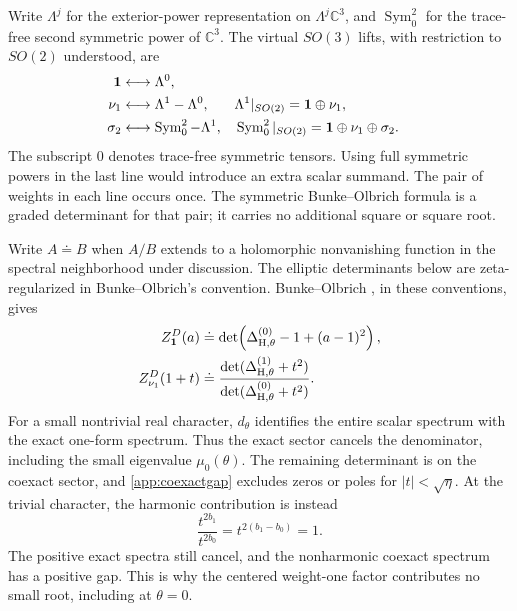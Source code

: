 \documentclass[11pt,letterpaper,reqno]{amsart}
\theoremstyle{remark}
\begin{document}
Write $\Lambda^j$ for the exterior-power representation on
$\Lambda^j\mathbb C^3$, and $\operatorname{Sym}^2_0$ for the trace-free
second symmetric power of $\mathbb C^3$. The virtual $SO(3)$ lifts,
with restriction to $SO(2)$ understood, are
\begin{align}\label{app:virtuallifts}
 \mathbf1&\longleftrightarrow\Lambda^0,\notag\\
 \nu_1&\longleftrightarrow\Lambda^1-\Lambda^0,
  &&\Lambda^1|_{SO(2)}=\mathbf1\oplus\nu_1,\notag\\
 \sigma_2&\longleftrightarrow\operatorname{Sym}^2_0-\Lambda^1,
  &&\operatorname{Sym}^2_0|_{SO(2)}
       =\mathbf1\oplus\nu_1\oplus\sigma_2.
\end{align}
The subscript $0$ denotes trace-free symmetric tensors. Using full
symmetric powers in the last line would introduce an extra scalar
summand. The pair of weights in each line occurs once. The symmetric
Bunke--Olbrich formula is a graded determinant for that pair; it carries
no additional square or square root.

Write $A\doteq B$ when $A/B$ extends to a holomorphic nonvanishing
function in the spectral neighborhood under discussion. The elliptic
determinants below are zeta-regularized in Bunke--Olbrich's convention.
Bunke--Olbrich
\cite[Proposition 4.7]{BO}, in these conventions, gives
\begin{align}\label{app:determinants}
 Z^D_{\mathbf1}(a)&\doteq
  \det\!\left(\Delta_{\mathrm H,\theta}^{(0)}-1+(a-1)^2\right),\notag\\
 Z^D_{\nu_1}(1+t)&\doteq
  \frac{\det(\Delta_{\mathrm H,\theta}^{(1)}+t^2)}
       {\det(\Delta_{\mathrm H,\theta}^{(0)}+t^2)}.
\end{align}
For a small nontrivial real character, $d_\theta$ identifies the entire
scalar spectrum with the exact one-form spectrum. Thus the exact
sector cancels the denominator, including the small eigenvalue
$\mu_0(\theta)$. The remaining determinant is on the coexact sector,
and \eqref{app:coexactgap} excludes zeros or poles for
$|t|<\sqrt\eta$. At the trivial character, the harmonic contribution
is instead
\begin{equation}\label{app:harmoniccancellation}
 \frac{t^{2b_1}}{t^{2b_0}}=t^{2(b_1-b_0)}=1.
\end{equation}
The positive exact spectra still cancel, and the nonharmonic coexact
spectrum has a positive gap. This is why the centered weight-one
factor contributes no small root, including at $\theta=0$.
\end{document}
